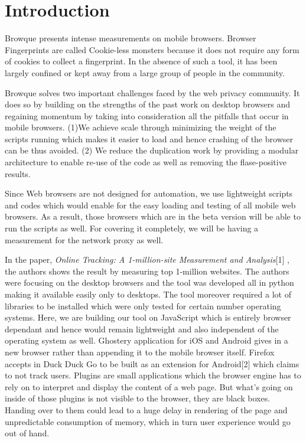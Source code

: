 \documentclass[journal]{IEEEtran}
\begin{document}
\section{Introduction}
Browque presents intense measurements on mobile browsers. Browser Fingerprints are called Cookie-less monsters because it does not require
any form of cookies to collect a fingerprint. In the absence of such a tool, it
has been largely confined or kept away from a large group of people in the
community. 


Browque solves two important challenges faced by the web privacy community. It
does so by building on the strengths of the past work on desktop browsers and
regaining momentum by taking into consideration all the pitfalls that occur in
mobile browsers. (1)We achieve scale through minimizing the weight of the
scripts running which makes it easier to load and hence crashing of the browser
can be thus avoided. (2) We reduce the duplication work by providing a modular
architecture to enable re-use of the code as well as removing the flase-positive results.

Since Web browsers are not designed for automation, we use lightweight scripts
and codes which would enable for the easy loading and testing of all mobile web
browsers. As a result, those browsers which are in the beta version will be able
to run the scripts as well. For covering it completely, we will be having a
measurement for the network proxy as well.


In the paper, \textit{Online Tracking: A 1-million-site Measurement and Analysis}[1] , the
authors shows the result by measuring top 1-million websites. The authors were
focusing on the desktop browsers and the tool was developed all in python making it
available easily only to desktops. The tool moreover required a lot of libraries to be
installed which were only tested for certain number operating systems. Here, we
are building our tool on JavaScript which is entirely browser dependant and
hence would remain lightweight and also independent of the operating system as
well. Ghostery application for iOS and Android gives in a new browser rather
than appending it to the mobile browser itself.  Firefox accepts in Duck Duck Go
to be built as an extension for Android[2] which claims to not track users. Plugins
are small applications which the browser engine has to rely on to interpret and
display the content of a web page. But what's going on inside of those plugins
is not visible to the browser, they are black boxes. Handing over to them could
lead to a huge delay in rendering of the page and unpredictable consumption of
memory, which in turn user experience would go out of hand. 
\end{document}
